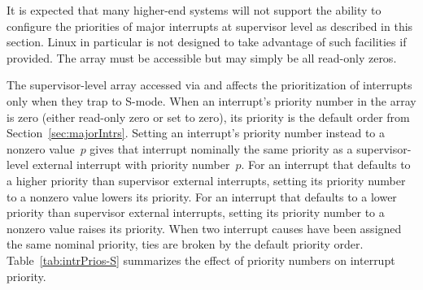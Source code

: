 \begin{commentary}
It is expected that many higher-end systems will not support
the ability to configure the priorities of major interrupts
at supervisor level as described in this section.
Linux in particular is not designed to
take advantage of such facilities if provided.
The\/  array must be accessible
but may simply be all read-only zeros.
\end{commentary}

The supervisor-level  array accessed via  and
 affects the prioritization of interrupts only when they trap
to \mbox{S-mode}.
When an interrupt's priority number in the array is zero (either
read-only zero or set to zero), its priority is the default order from
Section~\ref{sec:majorIntrs}.
Setting an interrupt's priority number instead to a nonzero value~$p$
gives that interrupt nominally the same priority as a supervisor-level
external interrupt with priority number~$p$.
For an interrupt that defaults to a higher priority than supervisor
external interrupts, setting its priority number to a nonzero value
lowers its priority.
For an interrupt that defaults to a lower priority than supervisor
external interrupts, setting its priority number to a nonzero value
raises its priority.
When two interrupt causes have been assigned the same nominal priority,
ties are broken by the default priority order.
Table~\ref{tab:intrPrios-S} summarizes the effect of priority numbers
on interrupt priority.

